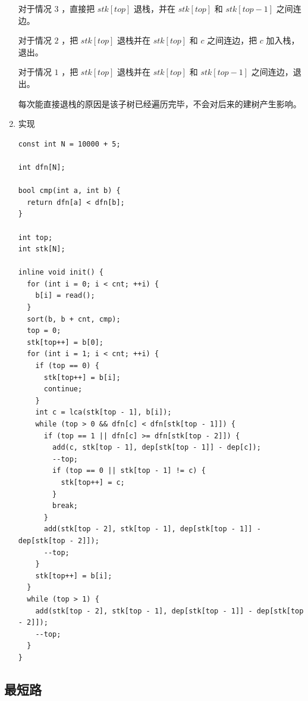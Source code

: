 \documentclass[11pt]{article}
\begin{document}
\begin{enumerate}
对于情况 $3$ ，直接把 $stk[top]$ 退栈，并在 $stk[top]$ 和 $stk[top-1]$ 之间连边。

对于情况 $2$ ，把 $stk[top]$ 退栈并在 $stk[top]$ 和 $c$ 之间连边，把 $c$ 加入栈，退出。

对于情况 $1$ ，把 $stk[top]$ 退栈并在 $stk[top]$ 和 $stk[top-1]$ 之间连边，退出。

每次能直接退栈的原因是该子树已经遍历完毕，不会对后来的建树产生影响。

\item 实现
\label{sec-6-5-4-2}

\begin{verbatim}
const int N = 10000 + 5;

int dfn[N];

bool cmp(int a, int b) {
  return dfn[a] < dfn[b];
}

int top;
int stk[N];

inline void init() {
  for (int i = 0; i < cnt; ++i) {
    b[i] = read();
  }
  sort(b, b + cnt, cmp);
  top = 0;
  stk[top++] = b[0];
  for (int i = 1; i < cnt; ++i) {
    if (top == 0) {
      stk[top++] = b[i];
      continue;
    }
    int c = lca(stk[top - 1], b[i]);
    while (top > 0 && dfn[c] < dfn[stk[top - 1]]) {
      if (top == 1 || dfn[c] >= dfn[stk[top - 2]]) {
        add(c, stk[top - 1], dep[stk[top - 1]] - dep[c]);
        --top;
        if (top == 0 || stk[top - 1] != c) {
          stk[top++] = c;
        }
        break;
      }
      add(stk[top - 2], stk[top - 1], dep[stk[top - 1]] - dep[stk[top - 2]]);
      --top;
    }
    stk[top++] = b[i];
  }
  while (top > 1) {
    add(stk[top - 2], stk[top - 1], dep[stk[top - 1]] - dep[stk[top - 2]]);
    --top;
  }
}
\end{verbatim}
\end{enumerate}
\subsection{最短路}
\label{sec-6-6}
\end{document}
